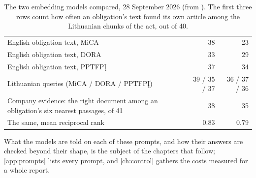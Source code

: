 \begin{table}[H]
\caption{The two embedding models compared, 28 September 2026 (from ). The first three rows count how often an obligation's text found its own article among the Lithuanian chunks of the act, out of 40.}\label{tab:models:embedcompare}
\begin{tabularx}{\textwidth}{@{}Yrr@{}}
\toprule
{} &  &  \\
\midrule
English obligation text, MiCA & 38 & 23 \\
English obligation text, DORA & 33 & 29 \\
English obligation text, PPTFPĮ & 37 & 34 \\
Lithuanian queries (MiCA / DORA / PPTFPĮ) & 39 / 35 / 37 & 36 / 37 / 36 \\
Company evidence: the right document among an obligation's six nearest passages, of 41 & 38 & 35 \\
The same, mean reciprocal rank & 0.83 & 0.79 \\
\bottomrule
\end{tabularx}
\end{table}

What the models are told on each of these prompts, and how their answers are checked beyond
their shape, is the subject of the chapters that follow; \cref{app:prompts} lists every
prompt, and \cref{ch:control} gathers the costs measured for a whole report.
